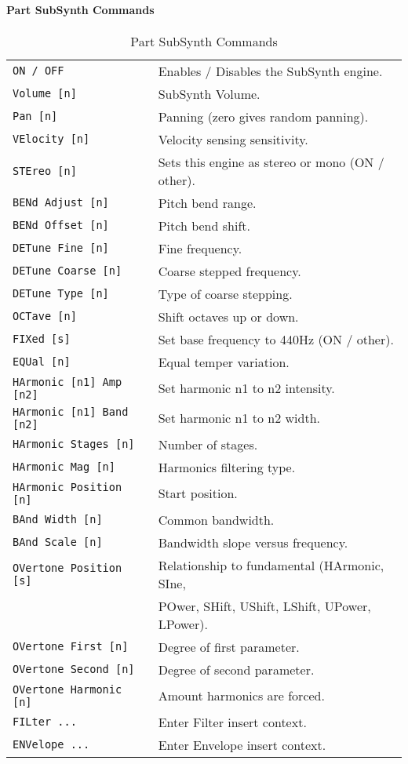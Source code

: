 \paragraph{Part SubSynth Commands}
\label{paragraph:command_line_part_subsynth_commands}

   \begin{table}[H]
      \centering
      \caption{Part SubSynth Commands}
      \label{table:yoshimi_part_subsynth_commands}
      \begin{tabular}{l l}

\texttt{ON / OFF} &
   Enables / Disables the SubSynth engine. \\
\texttt{Volume [n]} &
   SubSynth Volume.  \\
\texttt{Pan [n]} &
   Panning (zero gives random panning).\\
\texttt{VElocity [n]} &
   Velocity sensing sensitivity. \\
\texttt{STEreo [n]} &
   Sets this engine as stereo or mono (ON / other). \\
\texttt{BENd Adjust [n]} &
   Pitch bend range. \\
\texttt{BENd Offset [n]} &
   Pitch bend shift. \\
\texttt{DETune Fine [n]} &
   Fine frequency.   \\
\texttt{DETune Coarse [n]} &
   Coarse stepped frequency.  \\
\texttt{DETune Type [n]} &
   Type of coarse stepping.   \\
\texttt{OCTave [n]} &
   Shift octaves up or down.  \\
\texttt{FIXed [s]} &
   Set base frequency to 440Hz (ON / other).  \\
\texttt{EQUal [n]} &
   Equal temper variation. \\
\texttt{HArmonic [n1] Amp [n2]} &
   Set harmonic n1 to n2 intensity. \\
\texttt{HArmonic [n1] Band [n2]} &
   Set harmonic n1 to n2 width. \\
\texttt{HArmonic Stages [n]} &
   Number of stages. \\
\texttt{HArmonic Mag [n]} &
   Harmonics filtering type. \\
\texttt{HArmonic Position [n]} &
   Start position. \\
\texttt{BAnd Width [n]} &
   Common bandwidth. \\
\texttt{BAnd Scale [n]} &
   Bandwidth slope versus frequency. \\
\texttt{OVertone Position [s]} &
   Relationship to fundamental (HArmonic, SIne,\\
\texttt{} &
   POwer, SHift, UShift, LShift, UPower, LPower).\\
\texttt{OVertone First [n]} &
   Degree of first parameter. \\
\texttt{OVertone Second [n]} &
   Degree of second parameter.   \\
\texttt{OVertone Harmonic [n]} &
   Amount harmonics are forced.  \\
\texttt{FILter ...} &
   Enter Filter insert context.  \\
\texttt{ENVelope ...} &
   Enter Envelope insert context.   \\


\end{tabular}
\end{table}
